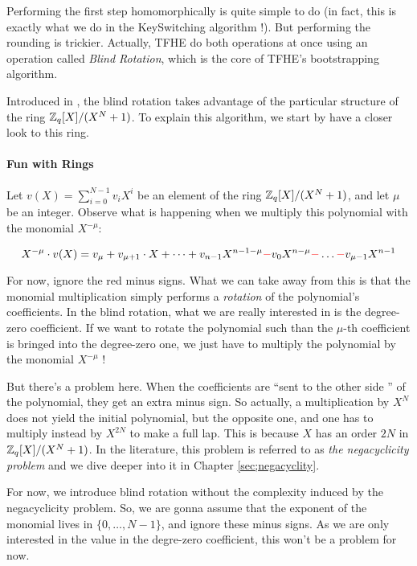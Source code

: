 Performing the first step homomorphically is quite simple to do (in fact, this is exactly what we do in the KeySwitching algorithm !). But performing the rounding is trickier. Actually, TFHE do both operations at once using an operation called \textit{Blind Rotation}, which is the core of TFHE's bootstrapping algorithm. 

Introduced in \cite{bibid}, the blind rotation takes advantage of the particular structure of the ring $\mathbb{Z}_q[X] / (X^N + 1)$. To explain this algorithm, we start by have a closer look to this ring.




\paragraph{Fun with Rings}

Let $v(X) = \sum_{i=0}^{N-1} v_i X^i$ be an element of the ring $\mathbb{Z}_q[X] / (X^N + 1)$, and let $\mu$ be an integer. Observe what is happening when we multiply this polynomial with the monomial $X^{-\mu}$:

\begin{equation*}
	X^{-\mu} \cdot v(X) = v_\mu + v_{\mu + 1} \cdot X + \dots + v_{n-1} X^{n-1-\mu} \textcolor{red}{-} v_0 X^{n - \mu} \textcolor{red}{-} \dots \textcolor{red}{-} v_{\mu - 1} X^{n-1}
\end{equation*}

For now, ignore the red minus signs. What we can take away from this is that the monomial multiplication simply performs a \textit{rotation} of the polynomial's coefficients. In the blind rotation, what we are really interested in is the degree-zero coefficient. If we want to rotate the polynomial such than the $\mu$-th coefficient is bringed into the degree-zero one, we just have to multiply the polynomial by the monomial $X^{-\mu}$ !

But there's a problem here. When the coefficients are ``sent to the other side '' of the polynomial, they get an extra minus sign. So actually, a multiplication by $X^N$ does not yield the initial polynomial, but the opposite one, and one has to multiply instead by $X^{2N}$ to make a full lap. This is because $X$ has an order $2N$ in $\mathbb{Z}_q[X] / (X^N + 1)$. In the literature, this problem is referred to as \textit{the negacyclicity problem} and we dive deeper into it in Chapter \ref{sec;negacyclity}.

For now, we introduce blind rotation without the complexity induced by the negacyclicity problem. So, we are gonna assume that the exponent of the monomial lives in $\lbrace 0, \dots, N-1 \rbrace$, and ignore these minus signs. As we are only interested in the value in the degre-zero coefficient, this won't be a problem for now.

